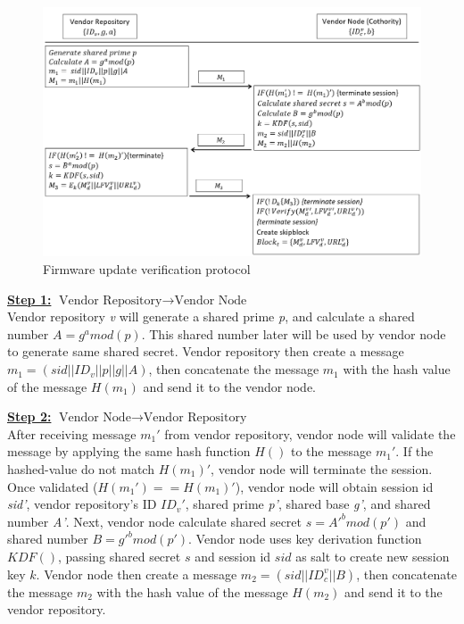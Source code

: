 \begin{figure}[H]
	\begin{center}
		\includegraphics[width=1.0\textwidth]{figures/verification_process_protocol.png}
		\caption{Firmware update verification protocol} 
		\label{fig:verificationprocessprotocol}
	\end{center}
\end{figure}

\noindent \underline{\textbf{Step 1:}} $\text{Vendor Repository}\rightarrow\text{Vendor Node}$ \\
\indent Vendor repository \textit{v} will generate a shared prime \textit{p}, and calculate a shared number \textit{$A=g^a mod(p)$}. This shared number later will be used by vendor node to generate same shared secret. Vendor repository then create a message \textit{$m_1=(sid||ID_v||p||g||A)$}, then concatenate the message \textit{$m_1$} with the hash value of the message \textit{$H(m_1)$} and send it to the vendor node.

\noindent \underline{\textbf{Step 2:}} $\text{Vendor Node}\rightarrow\text{Vendor Repository}$ \\
\indent After receiving message \textit{$m_1'$} from vendor repository, vendor node will validate the message by applying the same hash function \textit{$H()$} to the message \textit{$m_1'$}. If the hashed-value do not match \textit{$H(m_1)'$}, vendor node will terminate the session. Once validated (\textit{$H(m_1')==H(m_1)'$}), vendor node will obtain session id \textit{sid'}, vendor repository's ID \textit{$ID_v'$}, shared prime \textit{p'}, shared base \textit{g'}, and shared number \textit{A'}. Next, vendor node calculate shared secret \textit{$s=A'^bmod(p')$} and shared number \textit{$B=g'^bmod(p')$}. Vendor node uses key derivation function \textit{$KDF()$}, passing shared secret \textit{$s$} and session id \textit{$sid$} as salt to create new session key \textit{$k$}. Vendor node then create a message \textit{$m_2=(sid||ID_c^v||B)$}, then concatenate the message \textit{$m_2$} with the hash value of the message \textit{$H(m_2)$} and send it to the vendor repository.

